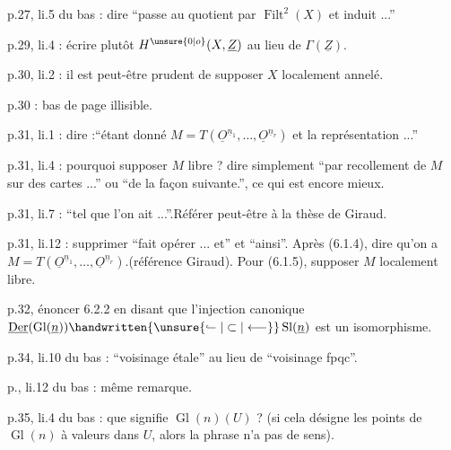 p.27, li.5 du bas : dire ``passe au quotient par $\operatorname{Filt}^{2}(X)$ et induit ...''

p.29, li.4 : écrire plutôt $H^{\unsure{0|o}}(X,\underline{Z})$  au lieu de $\Gamma(\underline{Z})$.


p.30, li.2 : il est peut-être prudent de supposer $X$ localement annelé.

p.30 : bas de page illisible.

p.31, li.1 : dire :``étant donné $M=T(\underline{O}^{\underline{n}_1},\ldots,\underline{O}^{\underline{n}_r})$ et la représentation ...''

p.31, li.4 : pourquoi supposer $M$ libre ? dire simplement ``par recollement de $M$ sur des cartes ...'' ou ``de la façon suivante.'', ce qui est  encore mieux.

p.31, li.7 : ``tel que l'on ait ...''.Référer peut-être à la thèse de Giraud.

p.31, li.12 : supprimer ``fait opérer ... et'' et ``ainsi''. Après (6.1.4), dire qu'on  a $M=T(\underline{O}^{\underline{n}_1},\ldots,\underline{O}^{\underline{n}_r})$.(référence Giraud). Pour (6.1.5), supposer $M$ localement libre.

p.32,  énoncer 6.2.2 en disant que l'injection canonique $\underline{\operatorname{Der}}(\operatorname{Gl}(\underline{n}))\handwritten{\unsure{\lhook\joinrel\relbar|\subset|\longleftarrow}}\operatorname{Sl}(\underline{n})$ est un isomorphisme. 

p.34, li.10 du bas : ``voisinage étale'' au lieu de ``voisinage fpqc''.

p., li.12 du bas : même remarque.

p.35, li.4 du bas : que signifie $\operatorname{Gl}(n)(U)$ ? (si cela désigne les points de $\operatorname{Gl}(n)$ à valeurs dans $U$, alors la phrase n'a pas de sens).
